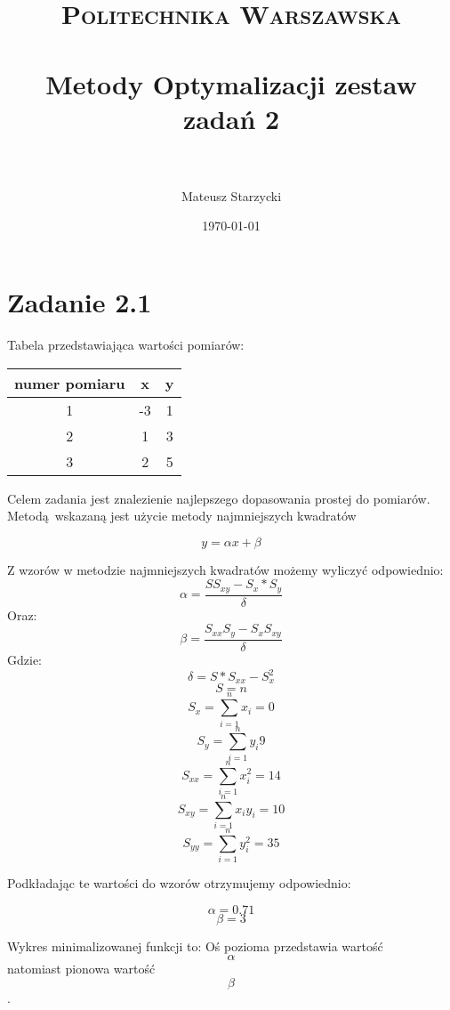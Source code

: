 \documentclass[paper=a4, fontsize=11pt]{scrartcl} %
\title{ 
    \normalfont \normalsize 
    \textsc{Politechnika Warszawska} \\ [25pt] %
    \horrule{0.5pt} \\[0.4cm] %
    \huge Metody Optymalizacji zestaw zadań 2\\ %
    \horrule{2pt} \\[0.5cm] %
}
\author{Mateusz Starzycki} %
\date{\normalsize\today} %
\begin{document}
\maketitle %


\newpage
\section{Zadanie 2.1}

Tabela przedstawiająca wartości pomiarów:
\newline  
\newline  
{
  \begin{tabular}{|c|c|c|}
    \hline
    numer pomiaru &  x & y \\
    \hline
    1 & -3 & 1 \\
    \hline
    2 & 1 & 3 \\
    \hline
    3 & 2 & 5 \\
    \hline

  \end{tabular}
}
\newline  
\newline  
Celem zadania jest znalezienie najlepszego dopasowania prostej do pomiarów.
Metodą wskazaną jest użycie metody najmniejszych kwadratów

\[y=\alpha x + \beta\]

Z wzorów w metodzie najmniejszych kwadratów możemy wyliczyć odpowiednio:
\[\alpha = \frac{SS_{xy}-S_x*S_y}{\delta}\]
Oraz:
\[\beta = \frac{S_{xx}S_y-S_xS_{xy}}{\delta}\]
Gdzie:
\[\delta=S*S_{xx}-S_x^2\]
\[S=n\]
\[S_x=\sum\limits_{i=1}^nx_i=0\]
\[S_y=\sum\limits_{i=1}^ny_i9\]
\[S_{xx}=\sum\limits_{i=1}^nx^2_i=14\]
\[S_{xy}=\sum\limits_{i=1}^nx_iy_i=10\]
\[S_{yy}=\sum\limits_{i=1}^ny^2_i=35\]


Podkładając te wartości do wzorów otrzymujemy odpowiednio:

\[\alpha = 0.71\]
\[\beta = 3\]

Wykres minimalizowanej funkcji to:
Oś pozioma przedstawia wartość \[\alpha\] natomiast pionowa wartość \[\beta\].
\end{document}
